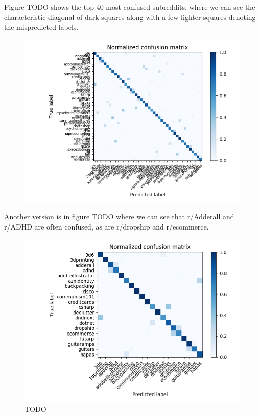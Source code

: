 \documentclass{sig-alternate-05-2015}
\begin{document}
Figure TODO shows the top 40 most-confused subreddits, where we can see the characteristic diagonal of dark squares along with a few lighter squares denoting the mispredicted labels.

\begin{figure}[H]
\centering
\includegraphics[width=\linewidth]{../plots/confusion-matrix-top-confused-labels-all.png}
\caption{}
\end{figure}

Another version is in figure TODO where we can see that r/Adderall and r/ADHD are often confused, as are r/dropship and r/ecommerce.

\begin{figure}[H]
\centering
\includegraphics[width=\linewidth]{../plots/confusion-matrix-top-confused-labels-0-to-20.png}
\caption{TODO}
\end{figure}
\end{document}
